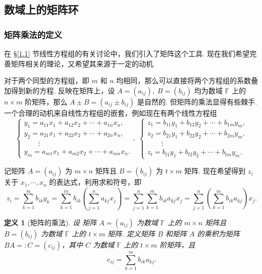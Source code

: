 \documentclass[10pt,openany]{article}
\theoremstyle{thmstyle} %
\theoremstyle{defstyle} %
\newtheorem{definition}[theorem]{定义}
\theoremstyle{prostyle} %
\theoremstyle{exastyle}
\theoremstyle{remstyle}
\newcommand{\F}{\mathbb{F}}
\begin{document}
\subsection{数域上的矩阵环}

\subsubsection{矩阵乘法的定义}

在 \S \ref{1.1} 节线性方程组的有关讨论中，我们引入了矩阵这个工具. 现在我们希望完善矩阵相关的理论，又希望其来源于一定的动机. 

对于两个同型的方程组，即 \( m \) 和 \( n \) 均相同，那么可以直接将两个方程组的系数叠加得到新的方程. 反映在矩阵上，设 \( A=(a_{ij}), \; B=(b_{ij}) \) 均为数域 \( \F \) 上的 \( n \times m \) 阶矩阵，那么 \( A \pm B=(a_{ij} \pm b_{ij}) \) 是自然的. 但矩阵的乘法显得有些棘手. 一个合理的动机来自线性方程组的嵌套，例如现在有两个线性方程组
\[ \left\{ \begin{array}{l}
	y_1= a_{11}x_1+a_{12}x_2+\cdots+a_{1n}x_n, \\
	y_2= a_{21}x_1+a_{22}x_2+\cdots+a_{2n}x_n, \\
	\qquad \vdots \\
	y_m= a_{m1}x_1+a_{m2}x_2+\cdots+a_{mn}x_n.
\end{array}\right. , \; \left\{ \begin{array}{l}
z_1= b_{11}y_1+b_{12}y_2+\cdots+b_{1m}y_m, \\
z_2= b_{21}y_1+b_{22}y_2+\cdots+b_{2m}y_m, \\
\qquad \vdots \\
z_t= b_{t1}y_1+b_{t2}y_2+\cdots+b_{tm}y_m.
\end{array}\right. \]

记矩阵 \( A=(a_{ij}) \) 为 \( m \times n \) 矩阵且 \( B=(b_{ij}) \) 为 \( t\times m \) 矩阵. 现在希望得到 \( z_i \) 关于 \( x_1,\cdots,x_n \) 的表达式，利用求和符号，即
\[ z_i=\sum_{k=1}^{m} b_{ik}y_k= \sum_{k=1}^{m} b_{ik} \left( \sum_{j=1}^{n} a_{kj} x_j \right)= \sum_{j=1}^{n} \sum_{k=1}^{m} b_{ik}a_{kj} x_j = \sum_{j=1}^{n} \left( \sum_{k=1}^{m} b_{ik}a_{kj}\right) x_j. \]

\begin{definition}[矩阵的乘法]	\label{1.3.1}
	设 矩阵 \( A=(a_{ij}) \) 为数域 \( \F \) 上的 \( m \times n \) 矩阵且 \( B=(b_{ij}) \) 为数域 \( \F \) 上的 \( t\times m \) 矩阵. 定义矩阵 \( B \) 和矩阵 \( A \) 的乘积为矩阵 \( BA=:C=(c_{ij}) \)，其中 \( C \) 为数域 \( \F \) 上的 \( t \times m \) 阶矩阵，且
	\[ c_{ij}=\sum_{k=1}^{m} b_{ik}a_{kj}. \] 

\end{definition}
\end{document}
